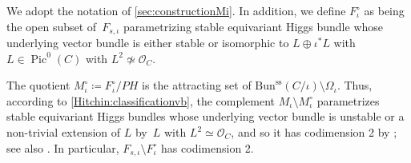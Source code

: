 \documentclass[JEP,XML,SOM,Unicode, NoEqCountersInSection,NoFloatCountersInSection,published]{cedram}
\let\mathcal\mathscr
\newcommand{\PH}{\mathit{PH}}
\theoremstyle{definition}
\newcommand{\Pic}{\operatorname{Pic}}
\begin{document}
We adopt the notation of \cref{sec:constructionMi}. In addition, we define $F^{\circ}_{\iota}$ as being the open subset of~$F_{s, \iota}$ parametrizing stable equivariant Higgs bundle whose underlying vector bundle is either stable or isomorphic to $L \oplus \iota^*L$ with $L \in \Pic^0(C)$ with $L^2 \not\simeq \mathcal{O}_C$.

The quotient $M^{\circ}_{\iota} \coloneqq F^{\circ}_{\iota}/\PH$ is the attracting set of $\mathrm{Bun}^\mathrm{ss}(C/\iota) \setminus \Omega_{\iota}$. Thus, accord\-ing to \cref{Hitchin:classificationvb},
the complement $M_{\iota} \setminus M^\circ_{\iota}$ parametrizes stable equivariant Higgs bundles whose underlying vector bundle is unstable or a non-trivial extension of $L$ by~$L$ with $L^2 \simeq \mathcal{O}_C$, and so it has codimension 2 by \cite[Ex.\,3.13(iv)\,\&\,(v)]{Hitchin1987}; see also \cite[Lem.\,3.4]{KiemYoo08}. In particular, $F_{s, \iota} \setminus F^{\circ}_{\iota}$ has codimension 2.
\end{document}

